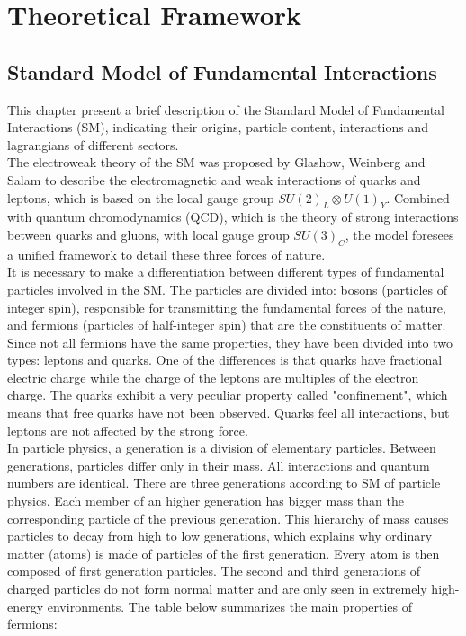\chapter{Theoretical Framework}


\section{Standard Model of Fundamental Interactions}

This chapter present a brief description of the Standard Model of Fundamental Interactions (SM), indicating their origins, particle content, interactions and  lagrangians of different sectors.\\
\indent
The electroweak theory of the SM was proposed by Glashow, Weinberg and Salam \cite{Glashow:1961tr, Salam, PhysRevLett.19.1264} to describe the electromagnetic and weak interactions of quarks and leptons, which is based on the local gauge group  $SU(2)_{L}\otimes U(1)_{Y}$.
Combined with quantum chromodynamics (QCD), which is the theory of strong interactions between quarks and gluons, with local gauge group $SU(3)_{C}$, the model foresees a unified framework to detail these three forces of nature.\\
\indent
It is necessary to make a differentiation between different types of fundamental particles involved in the SM. The particles are divided into: bosons (particles of integer spin), responsible for transmitting the fundamental forces of the nature, and fermions (particles of half-integer spin) that are the constituents of matter. Since not all fermions have the same properties, they have been divided into two types: leptons and quarks. One of the differences is that quarks have fractional electric charge while the charge of the leptons are multiples of the electron charge. The quarks exhibit a very peculiar property called "confinement", which means that free quarks have not been observed. Quarks feel all interactions, but leptons are not affected by the strong force.\\
\indent
In particle physics, a generation is a division of elementary particles. Between generations, particles differ only in their mass. All interactions and quantum numbers are identical. There are three generations according to SM of particle physics. Each member of an higher generation has bigger mass than the corresponding particle of the previous generation. This hierarchy of mass causes particles to decay from high to low generations, which explains why ordinary matter (atoms) is made of particles of the first generation. Every atom is then composed of first generation particles. The second and third generations of charged particles do not form normal matter and are only seen in extremely high-energy environments. The table below  summarizes the main properties of fermions:

